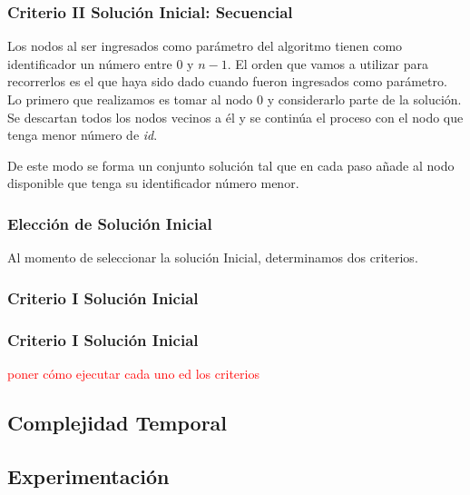 \subsubsection*{Criterio II Solución Inicial: Secuencial}

Los nodos al ser ingresados como parámetro del algoritmo tienen como identificador un número entre $0$ y $n-1$. El orden que vamos a utilizar para recorrerlos es el que haya sido dado cuando fueron ingresados como parámetro.\\

Lo primero que realizamos es tomar al nodo $0$ y considerarlo parte de la solución. Se descartan todos los nodos vecinos a él y se continúa el proceso con el nodo que tenga menor número de \textit{id}.

De este modo se forma un conjunto solución tal que en cada paso añade al nodo disponible que tenga su identificador número menor.

\subsubsection{Elección de Solución Inicial}

Al momento de seleccionar la solución Inicial, determinamos dos criterios.

\subsubsection*{Criterio I Solución Inicial}

\subsubsection*{Criterio I Solución Inicial}





\textcolor{red}{poner cómo ejecutar cada uno ed los criterios}

\subsection{Complejidad Temporal}
\subsection{Experimentaci\'on}
